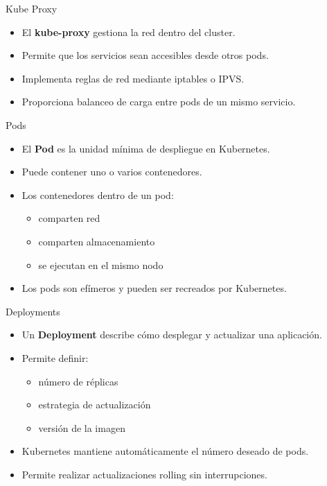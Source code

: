 \documentclass{beamer}
\begin{document}
\begin{frame}{Kube Proxy}
\begin{itemize}
\item El \textbf{kube-proxy} gestiona la red dentro del cluster.
\item Permite que los servicios sean accesibles desde otros pods.
\item Implementa reglas de red mediante iptables o IPVS.
\item Proporciona balanceo de carga entre pods de un mismo servicio.
\end{itemize}
\end{frame}

\begin{frame}{Pods}
\begin{itemize}
\item El \textbf{Pod} es la unidad mínima de despliegue en Kubernetes.
\item Puede contener uno o varios contenedores.
\item Los contenedores dentro de un pod:
\begin{itemize}
\item comparten red
\item comparten almacenamiento
\item se ejecutan en el mismo nodo
\end{itemize}
\item Los pods son efímeros y pueden ser recreados por Kubernetes.
\end{itemize}
\end{frame}

\begin{frame}{Deployments}
\begin{itemize}
\item Un \textbf{Deployment} describe cómo desplegar y actualizar una aplicación.
\item Permite definir:
\begin{itemize}
\item número de réplicas
\item estrategia de actualización
\item versión de la imagen
\end{itemize}
\item Kubernetes mantiene automáticamente el número deseado de pods.
\item Permite realizar actualizaciones rolling sin interrupciones.
\end{itemize}
\end{frame}
\end{document}
